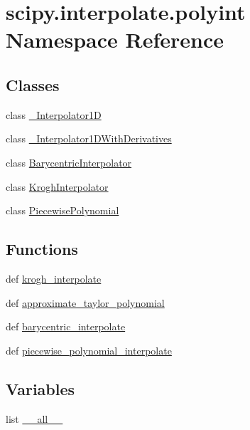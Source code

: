 \hypertarget{namespacescipy_1_1interpolate_1_1polyint}{}\section{scipy.\+interpolate.\+polyint Namespace Reference}
\label{namespacescipy_1_1interpolate_1_1polyint}
\subsection*{Classes}
\begin{DoxyCompactItemize}
\item 
class \hyperlink{classscipy_1_1interpolate_1_1polyint_1_1__Interpolator1D}{\+\_\+\+Interpolator1\+D}
\item 
class \hyperlink{classscipy_1_1interpolate_1_1polyint_1_1__Interpolator1DWithDerivatives}{\+\_\+\+Interpolator1\+D\+With\+Derivatives}
\item 
class \hyperlink{classscipy_1_1interpolate_1_1polyint_1_1BarycentricInterpolator}{Barycentric\+Interpolator}
\item 
class \hyperlink{classscipy_1_1interpolate_1_1polyint_1_1KroghInterpolator}{Krogh\+Interpolator}
\item 
class \hyperlink{classscipy_1_1interpolate_1_1polyint_1_1PiecewisePolynomial}{Piecewise\+Polynomial}
\end{DoxyCompactItemize}
\subsection*{Functions}
\begin{DoxyCompactItemize}
\item 
def \hyperlink{namespacescipy_1_1interpolate_1_1polyint_abe6652712f6fbc1b9a509c5f4f6b5fb6}{krogh\+\_\+interpolate}
\item 
def \hyperlink{namespacescipy_1_1interpolate_1_1polyint_ad7b8573dc762bf3c678bf3dcd6b721bc}{approximate\+\_\+taylor\+\_\+polynomial}
\item 
def \hyperlink{namespacescipy_1_1interpolate_1_1polyint_a9a56ff9787749389b7c117a66bbc5635}{barycentric\+\_\+interpolate}
\item 
def \hyperlink{namespacescipy_1_1interpolate_1_1polyint_ab6386a8c0735800e49d5c52c5531b178}{piecewise\+\_\+polynomial\+\_\+interpolate}
\end{DoxyCompactItemize}
\subsection*{Variables}
\begin{DoxyCompactItemize}
\item 
list \hyperlink{namespacescipy_1_1interpolate_1_1polyint_a2c5c933c7cc4ed4182fdfc30a752b009}{\+\_\+\+\_\+all\+\_\+\+\_\+}
\end{DoxyCompactItemize}


